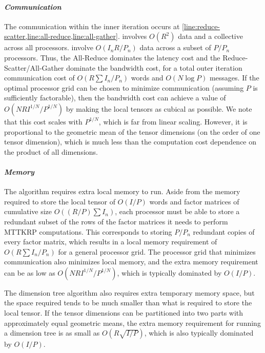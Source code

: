 \paragraph{\emph{Communication}}
The communication within the inner iteration occurs at \cref{line:reduce-scatter,line:all-reduce,line:all-gather}.
 involves $O(R^2)$ data and a collective across all processors.
 involve $O(I_nR/P_n)$ data across a subset of $P/P_n$ processors.
Thus, the All-Reduce dominates the latency cost and the Reduce-Scatter/All-Gather dominate the bandwidth cost, for a total outer iteration communication cost of $O(R\sum I_n/P_n)$ words and $O(N\log P)$ messages.
If the optimal processor grid can be chosen to minimize communication (assuming $P$ is sufficiently factorable), then the bandwidth cost can achieve a value of $O(NRI^{1/N}/P^{1/N})$ by making the local tensors as cubical as possible.
We note that this cost scales with $P^{1/N}$, which is far from linear scaling.
However, it is proportional to the geometric mean of the tensor dimensions (on the order of one tensor dimension), which is much less than the computation cost dependence on the product of all dimensions.

\paragraph{\emph{Memory}}
The algorithm requires extra local memory to run.
Aside from the memory required to store the local tensor of $O(I/P)$ words and factor matrices of cumulative size $O((R/P)\sum I_n)$, each processor must be able to store a redundant subset of the rows of the factor matrices it needs to perform MTTKRP computations.
This corresponds to storing $P/P_n$ redundant copies of every factor matrix, which results in a local memory requirement of $O(R \sum I_n/P_n)$ for a general processor grid.
The processor grid that minimizes communication also minimizes local memory, and the extra memory requirement can be as low as $O(NRI^{1/N}/P^{1/N})$, which is typically dominated by $O(I/P)$.

The dimension tree algorithm also requires extra temporary memory space, but the space required tends to be much smaller than what is required to store the local tensor.
If the tensor dimensions can be partitioned into two parts with approximately equal geometric means, the extra memory requirement for running a dimension tree is as small as $O(R\sqrt{I/P})$, which is also typically dominated by $O(I/P)$.


